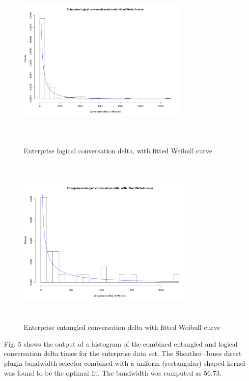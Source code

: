 \documentclass[conference]{IEEEtran}
\begin{document}
\begin{figure}
\begin{center}
\includegraphics[height=9cm, width=8.5cm]{03_delta_logical_enterprise.pdf} 
\caption{Enterprise logical conversation delta, with fitted Weibull curve}
\end{center}
\label{fig:delta_log_ent}
\end{figure}

\begin{figure}
\begin{center}
\includegraphics[height=8.5cm, width=9cm]{04_delta_entangled_enterprise.pdf} 
\caption{Enterprise entangled conversation delta with fitted Weibull curve}
\end{center}
\label{fig:delta_ent_ent}
\end{figure}

Fig. 5 shows the output of a histogram of the combined entangled and logical conversation delta times for the enterprise data set. The Sheather--Jones direct plugin bandwidth selector combined with a uniform (rectangular) shaped kernel was found to be the optimal fit.  The bandwidth was computed as 56.73.
\end{document}
